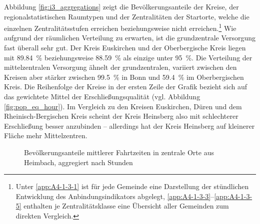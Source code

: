 \documentclass[11pt,pdftex,a4paper]{scrartcl}
\begin{document}
	Abbildung \ref{fig:i3_aggregations} zeigt die Bevölkerungsanteile der Kreise, der regionalstatistischen Raumtypen und der Zentralitäten der Startorte, welche die einzelnen Zentralitätsstufen erreichen beziehungsweise nicht erreichen.\footnote{Unter \ref{app:A4-1-3-1} ist für jede Gemeinde eine Darstellung der stündlichen Entwicklung des Anbindungsindikators abgelegt, \ref{app:A4-1-3-3}--\ref{app:A4-1-3-5} enthalten je Zentralitätsklasse eine Übersicht aller Gemeinden zum direkten Vergleich.} Wie aufgrund der räumlichen Verteilung zu erwarten, ist die grundzentrale Versorgung fast überall sehr gut. Der Kreis Euskirchen und der Oberbergische Kreis liegen mit \SI{89.84}{\percent} beziehungsweise \SI{88.59}{\percent} als einzige unter \SI{95}{\percent}. Die Verteilung der mittelzentralen Versorgung ähnelt der grundzentralen, variiert zwischen den Kreisen aber stärker zwischen \SI{99.5}{\percent} in Bonn und \SI{59.4}{\percent} im Oberbergischen Kreis. Die Reihenfolge der Kreise in der ersten Zeile der Grafik bezieht sich auf das gewichtete Mittel der Erschließungsqualität (vgl. Abbildung \ref{fig:pop_eq_hour}). Im Vergleich zu den Kreisen Euskirchen, Düren und dem Rheinisch-Bergischen Kreis scheint der Kreis Heinsberg also mit schlechterer Erschließung besser anzubinden -- allerdings hat der Kreis Heinsberg auf kleinerer Fläche mehr Mittelzentren. 	
	
	\begin{figure}[!htbp]
		\centering
		
		\caption[Mittlere Fahrtzeiten in zentrale Orte aus Heimbach]{Bevölkerungsanteile mittlerer Fahrtzeiten in zentrale Orte aus Heimbach, aggregiert nach Stunden}
		\label{fig:hourlytti3heimbach}
	\end{figure}
	
\end{document}
